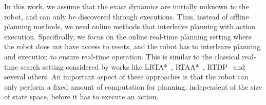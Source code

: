 In this work, we assume that the exact dynamics are
initially unknown to the robot, and can only be discovered through
executions. Thus, instead of offline planning
methods, we need
online methods that interleave planning with action execution. Specifically, we 
focus on the online real-time planning
setting where the robot does not have access to resets, and the
robot has to interleave planning and execution to ensure real-time
operation. This is similar to the classical real-time search setting
considered by works like LRTA*~\cite{DBLP:journals/ai/Korf90},
RTAA*~\cite{DBLP:conf/atal/KoenigL06}, RTDP~\cite{DBLP:journals/ai/BartoBS95} and
several others. An important aspect of these approaches is that the robot can only perform a fixed amount of
computation for planning, independent of the size of state space, before it has to execute an action.


